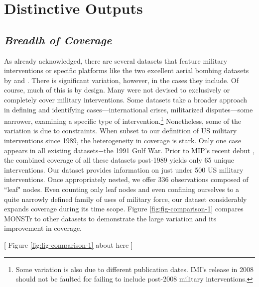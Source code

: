 \documentclass[fleqn,12pt]{article}
\begin{document}
\section*{Distinctive Outputs}
\subsection*{\textit{Breadth of Coverage}}
As already acknowledged, there are several datasets that feature military interventions or specific platforms like the two excellent aerial bombing datasets by \citet{HorowitzReiter01} and \citet{AllenMM17}. There is significant variation, however, in the cases they include. Of course, much of this is by design. Many were not devised to exclusively or completely cover military interventions. Some datasets take a broader approach in defining and identifying cases—international crises, militarized disputes—some narrower, examining a specific type of intervention.\footnote{Some variation is also due to different publication dates. IMI's release in 2008 should not be faulted for failing to include post-2008 military interventions.} Nonetheless, some of the variation is due to constraints. When subset to our definition of US military interventions since 1989, the heterogeneity in coverage is stark. Only one case appears in all existing datasets$-$the 1991 Gulf War. Prior to MIP’s recent debut \citep{KushiDT22}, the combined coverage of all these datasets post-1989 yields only 65 unique interventions. Our dataset provides information on just under 500 US military interventions. Once appropriately nested, we offer 336 observations composed of ``leaf" nodes. Even counting only leaf nodes and even confining ourselves to a quite narrowly defined family of uses of military force, our dataset considerably expands coverage during its time scope. Figure \ref{fig:fig-comparison-1} compares MONSTr to other datasets to demonstrate the large variation and its improvement in coverage.

\begin{center}
    [ Figure \ref{fig:fig-comparison-1} about here ]
\end{center}
\end{document}
